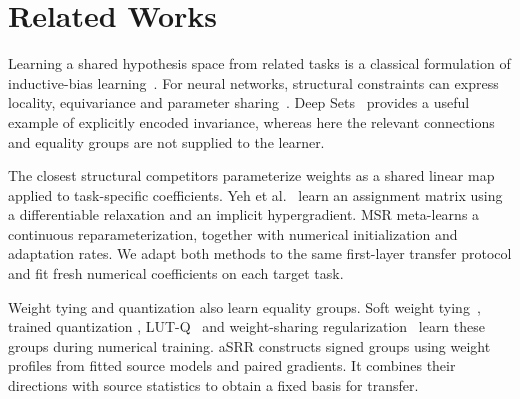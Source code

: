 \section{Related Works}

Learning a shared hypothesis space from related tasks is a classical
formulation of inductive-bias learning~\cite{baxter2000model}.
For neural networks, structural constraints can express locality,
equivariance and parameter sharing~\cite{ravanbakhsh2017equivariance}.
Deep Sets~\cite{zaheer2017deep} provides a useful example of explicitly
encoded invariance, whereas here the relevant connections and equality
groups are not supplied to the learner.

The closest structural competitors parameterize weights as a shared
linear map applied to task-specific coefficients. Yeh
et al.~\cite{yeh2022equivariance} learn an assignment matrix using a
differentiable relaxation and an implicit hypergradient. MSR
\cite{zhou2021meta} meta-learns a continuous reparameterization,
together with numerical initialization and adaptation rates.
We adapt both methods to the same first-layer transfer protocol and
fit fresh numerical coefficients on each target task.

Weight tying and quantization also learn equality groups.
Soft weight tying~\cite{nowlan1991adaptive}, trained quantization
\cite{han2016deep}, LUT-Q~\cite{cardinaux2018iteratively} and
weight-sharing regularization~\cite{shakerinava2024weight} learn these
groups during numerical training. aSRR constructs signed groups
using weight profiles from fitted source models and paired gradients.
It combines their directions with source statistics to obtain a
fixed basis for transfer.
